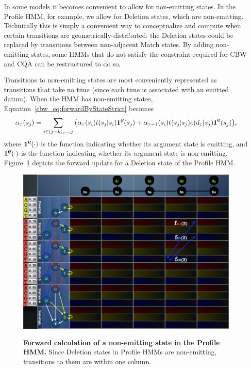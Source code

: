 \documentclass[preprint,12pt,authoryear]{elsarticle}
\newcommand{\datum}{\ensuremath{d}}
\newcommand{\Time}{\ensuremath{\tau}}
\newcommand{\state}{\ensuremath{s}}
\newcommand{\HMMtransitionLaw}{\ensuremath{t}}
\newcommand{\HMMemissionLaw}{\ensuremath{e}}
\newcommand{\forward}{\ensuremath{\alpha}}
\begin{document}
In some models it becomes convenient to allow for non-emitting states.  In the Profile HMM, for example, we allow for Deletion states, which are non-emitting.  Technically this is simply a convenient way to conceptualize and compute when certain transitions are geometrically-distributed: the Deletion states could be replaced by transitions between non-adjacent Match states.  By adding non-emitting states, some HMMs that do not satisfy the constraint required for CBW and CQA can be restructured to do so.

Transitions to non-emitting states are most conveniently represented as transitions that take no time (since each time is associated with an emitted datum).  When the HMM has non-emitting states, Equation~\ref{cbw_eq:forwardByStateStrict} becomes
\begin{equation}\label{cbw_eq:forwardByState}
\forward_{\Time}( \state_j )
= \sum_{i \in (j-k), \dots, j}{ \bigl( \forward_{\Time}( \state_i ) \HMMtransitionLaw( \state_j | \state_i )\bm{1}^{\not{\hbox{e}}}(\state_j) + \forward_{\Time - 1}( \state_i ) \HMMtransitionLaw( \state_j | \state_j ) \HMMemissionLaw( \datum_{\Time} | \state_j )\bm{1}^{\hbox{e}}(\state_j) \bigr) } \hbox{,}
\end{equation}
where $\bm{1}^{\hbox{e}}(\cdot)$ is the function indicating whether its argument state is emitting, and $\bm{1}^{\not{\hbox{e}}}(\cdot)$ is the function indicating whether its argument state is non-emitting.  Figure~\ref{cbw_fig:Plan7ForwardByState_Deletion} depicts the forward update for a Deletion state of the Profile HMM.

\begin{figure}[htp]
\centering
\includegraphics[scale=.35]{Plan7ForwardByState_Deletion.pdf} \\
 \caption{\textbf{Forward calculation of a non-emitting state in the Profile HMM.}  Since Deletion states in Profile HMMs are non-emitting, transitions to them are within one column.}
  \label{cbw_fig:Plan7ForwardByState_Deletion}
\end{figure}
\end{document}
